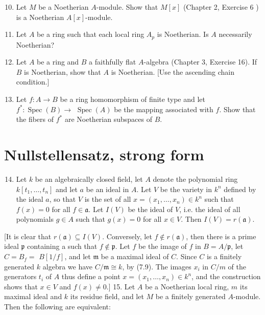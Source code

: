 \documentclass{standalone}
\theoremstyle{definition}
\theoremstyle{remark}
\begin{document}
\begin{enumerate}
  \setcounter{enumi}{9}
  \item Let $M$ be a Noetherian $A$-module. Show that $M[x]$ (Chapter 2, Exercise 6 ) is a Noetherian $A[x]$-module.

  \item Let $A$ be a ring such that each local ring $A_{p}$ is Noetherian. Is $A$ necessarily Noetherian?

  \item Let $A$ be a ring and $B$ a faithfully flat $A$-algebra (Chapter 3, Exercise 16). If $B$ is Noetherian, show that $A$ is Noetherian. [Use the ascending chain condition.]

  \item Let $f: A \rightarrow B$ be a ring homomorphism of finite type and let $f^{*}: \operatorname{Spec}(B) \rightarrow$ $\operatorname{Spec}(A)$ be the mapping associated with $f$. Show that the fibers of $f^{*}$ are Noetherian subspaces of $B$.

\end{enumerate}

\section{Nullstellensatz, strong form}
\begin{enumerate}
  \setcounter{enumi}{13}
  \item Let $k$ be an algebraically closed field, let $A$ denote the polynomial ring $k\left[t_{1}, \ldots, t_{n}\right]$ and let $a$ be an ideal in $A$. Let $V$ be the variety in $k^{n}$ defined by the ideal $a$, so that $V$ is the set of all $x=\left(x_{1}, \ldots, x_{n}\right) \in k^{n}$ such that $f(x)=0$ for all $f \in \mathfrak{a}$. Let $I(V)$ be the ideal of $V$, i.e. the ideal of all polynomials $g \in A$ such that $g(x)=0$ for all $x \in V$. Then $I(V)=r(\mathfrak{a})$.
\end{enumerate}

[It is clear that $r(\mathfrak{a}) \subseteq I(V)$. Conversely, let $f \notin r(\mathfrak{a})$, then there is a prime ideal $\mathfrak{p}$ containing a such that $f \notin \mathfrak{p}$. Let $f$ be the image of $f$ in $B=A / \mathfrak{p}$, let $C=B_{f}=$ $B[1 / f]$, and let $\mathfrak{m}$ be a maximal ideal of $C$. Since $C$ is a finitely generated $k$ algebra we have $C / \mathfrak{m} \cong k$, by (7.9). The images $x_{i}$ in $C / m$ of the generators $t_{i}$ of $A$ thus define a point $x=\left(x_{1}, \ldots, x_{n}\right) \in k^{n}$, and the construction shows that $x \in V$ and $f(x) \neq 0$.] 15. Let $A$ be a Noetherian local ring, $m$ its maximal ideal and $k$ its residue field, and let $M$ be a finitely generated $A$-module. Then the following are equivalent:
\end{document}
